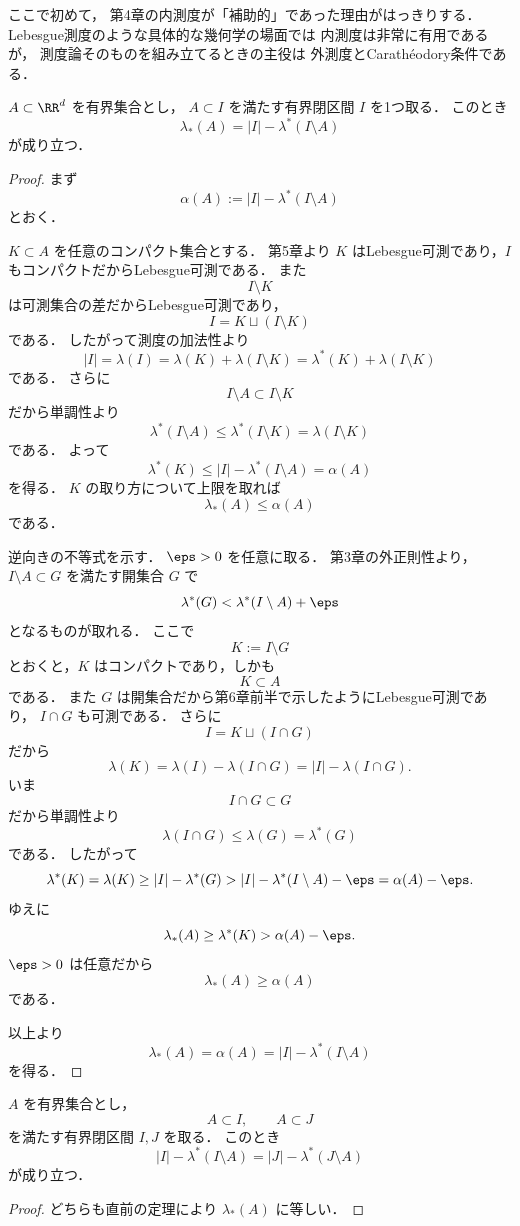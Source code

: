 \begin{remark}
ここで初めて，
第4章の内測度が「補助的」であった理由がはっきりする．
Lebesgue測度のような具体的な幾何学の場面では
内測度は非常に有用であるが，
測度論そのものを組み立てるときの主役は
外測度とCarathéodory条件である．
\end{remark}

\begin{theorem}[有界集合に対する内測度の別定義]
$A \subset \RR^d$ を有界集合とし，
$A \subset I$ を満たす有界閉区間 $I$ を1つ取る．
このとき
\[
\lambda_*(A)=|I|-\lambda^*(I\setminus A)
\]
が成り立つ．
\end{theorem}
\begin{proof}
まず
\[
\alpha(A):=|I|-\lambda^*(I\setminus A)
\]
とおく．

$K \subset A$ を任意のコンパクト集合とする．
第5章より $K$ はLebesgue可測であり，$I$ もコンパクトだからLebesgue可測である．
また
\[
I\setminus K
\]
は可測集合の差だからLebesgue可測であり，
\[
I=K\sqcup(I\setminus K)
\]
である．
したがって測度の加法性より
\[
|I|=\lambda(I)=\lambda(K)+\lambda(I\setminus K)=\lambda^*(K)+\lambda(I\setminus K)
\]
である．
さらに
\[
I\setminus A \subset I\setminus K
\]
だから単調性より
\[
\lambda^*(I\setminus A)\le \lambda^*(I\setminus K)=\lambda(I\setminus K)
\]
である．
よって
\[
\lambda^*(K)\le |I|-\lambda^*(I\setminus A)=\alpha(A)
\]
を得る．
$K$ の取り方について上限を取れば
\[
\lambda_*(A)\le \alpha(A)
\]
である．

逆向きの不等式を示す．
$\eps>0$ を任意に取る．
第3章の外正則性より，
$I\setminus A \subset G$ を満たす開集合 $G$ で
\[
\lambda^*(G)<\lambda^*(I\setminus A)+\eps
\]
となるものが取れる．
ここで
\[
K:=I\setminus G
\]
とおくと，$K$ はコンパクトであり，しかも
\[
K\subset A
\]
である．
また $G$ は開集合だから第6章前半で示したようにLebesgue可測であり，
$I\cap G$ も可測である．
さらに
\[
I=K\sqcup(I\cap G)
\]
だから
\[
\lambda(K)=\lambda(I)-\lambda(I\cap G)=|I|-\lambda(I\cap G).
\]
いま
\[
I\cap G\subset G
\]
だから単調性より
\[
\lambda(I\cap G)\le \lambda(G)=\lambda^*(G)
\]
である．
したがって
\[
\lambda^*(K)=\lambda(K)\ge |I|-\lambda^*(G)> |I|-\lambda^*(I\setminus A)-\eps=\alpha(A)-\eps.
\]
ゆえに
\[
\lambda_*(A)\ge \lambda^*(K)>\alpha(A)-\eps.
\]
$\eps>0$ は任意だから
\[
\lambda_*(A)\ge \alpha(A)
\]
である．

以上より
\[
\lambda_*(A)=\alpha(A)=|I|-\lambda^*(I\setminus A)
\]
を得る．
\end{proof}

\begin{corollary}[区間の取り方によらない]
$A$ を有界集合とし，
\[
A\subset I,\qquad A\subset J
\]
を満たす有界閉区間 $I,J$ を取る．
このとき
\[
|I|-\lambda^*(I\setminus A)=|J|-\lambda^*(J\setminus A)
\]
が成り立つ．
\end{corollary}
\begin{proof}
どちらも直前の定理により $\lambda_*(A)$ に等しい．
\end{proof}

